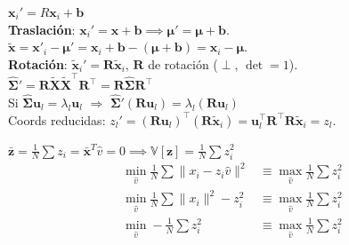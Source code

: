 \documentclass[10pt, a4paper]{article}
\newcommand{\x}{\mathbf{x}}
\newcommand{\X}{\mathbf{X}}
\newcommand{\z}{\mathbf{z}}
\newcommand{\bias}{\mathbf{b}}
\newcommand{\muu}{\boldsymbol{\mu}}
\newcommand{\Sig}{\boldsymbol{\Sigma}}
\begin{document}
\begin{minipage}[t]{0.3299\textwidth}
\begin{tcolorbox}[formulabox={Demo: PCA invariante roto-traslaciones}, colframe=softBrown]
    $\x_i'= R\x_i + \bias$\\
    \textbf{Traslación}: $\x_i'=\x + \bias \implies \muu' = \muu + \bias$.\\
    $\tilde{\x}=\x'_i - \muu'  = \x_i + \bias - (\muu+ \bias) = \x_i - \muu$.\\
    \textbf{Rotación}: $\tilde{\x}_i' = \mathbf{R}\tilde{\x}_i$, $\mathbf{R}$ de rotación ($\perp$, $\det = 1$). \\
    $\hat{\Sig}' = \mathbf{R}\tilde{\X}\tilde{\X}^\top\mathbf{R}^\top = \mathbf{R}\hat{\Sig}\mathbf{R}^\top$\\
    Si $\hat{\Sig}\mathbf{u}_l=\lambda_l\mathbf{u}_l$ $\Rightarrow$ $\hat{\Sig}'(\mathbf{R}\mathbf{u}_l)=\lambda_l(\mathbf{R}\mathbf{u}_l)$\\
    Coords reducidas: $z_l' = (\mathbf{R}\mathbf{u}_l)^\top(\mathbf{R}\tilde{\x}_i) = \mathbf{u}_l^\top\mathbf{R}^\top\mathbf{R}\tilde{\x}_i = z_l$.
\end{tcolorbox}
 
\begin{tcolorbox}[formulabox={Demo: PCA: $\max \mathbb{V}[\z] \equiv \min \tfrac{1}{N}\|\x-\tilde{\x}\|^2$}, colframe=softBrown]
    $\bar{\z} = \tfrac{1}{N}\sum z_i = \bar{\x}^T \hat{v}=0 \implies \mathbb{V}[\z]=\tfrac{1}{N}\sum z_i^2$
    \begin{align*}
        \min_{\hat{v}} \tfrac{1}{N}\sum\|x_i-z_i\hat{v}\|^2 &\equiv \max_{\hat{v}} \tfrac{1}{N}\sum z_i^2 \\
        \min_{\hat{v}} \tfrac{1}{N}\sum \|x_i\|^2- z_i^2 &\equiv \max_{\hat{v}} \tfrac{1}{N}\sum z_i^2 \\
        \min_{\hat{v}} -\tfrac{1}{N}\sum z_i^2 &\equiv \max_{\hat{v}} \tfrac{1}{N}\sum z_i^2
    \end{align*}
\end{tcolorbox}

\end{minipage}
\hfill
\end{document}
